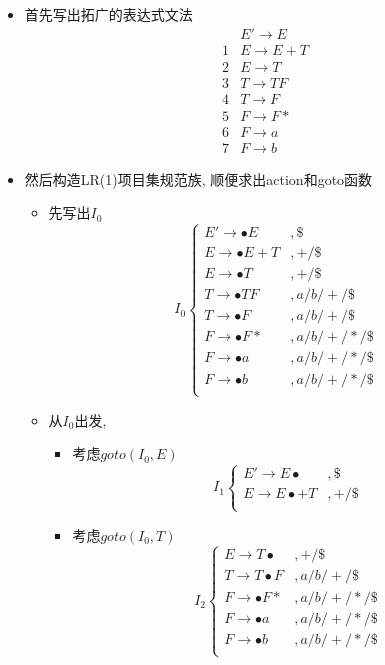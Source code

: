 \documentclass[UTF8]{article}
\newcommand{\blt}{\bullet}
\begin{document}
\begin{itemize}
\item 首先写出拓广的表达式文法
$$\begin{array}{ll}
 & E'\rightarrow E\\
1 & E\rightarrow E+T\\
2 & E\rightarrow T\\
3 & T\rightarrow TF\\
4 & T\rightarrow F\\
5 & F\rightarrow F*\\
6 & F\rightarrow a\\
7 & F\rightarrow b
\end{array}$$
\item 然后构造LR(1)项目集规范族, 顺便求出action和goto函数
	\begin{itemize}
	\item 先写出$I_0$
	$$I_0\left\{\begin{array}{ll}
	E'\rightarrow \blt E & ,\$\\
	E\rightarrow \blt E+T & ,+/\$\\
	E\rightarrow\blt T & ,+/\$\\
	T\rightarrow\blt TF & ,a/b/+/\$\\
	T\rightarrow\blt F & , a/b/+/\$\\
	F\rightarrow\blt F* & , a/b/+/*/\$\\
	F\rightarrow\blt a & ,a/b/+/*/\$\\
	F\rightarrow\blt b & ,a/b/+/*/\$\\
	\end{array}\right.$$
	\item 从$I_0$出发,
		\begin{itemize}
		\item 考虑$goto(I_0,E)$
			$$I_1\left\{\begin{array}{ll}
			E'\rightarrow E\blt & ,\$\\
			E\rightarrow  E\blt+T & ,+/\$\\
			\end{array}\right.$$
		\item 考虑$goto(I_0,T)$
			$$I_2\left\{\begin{array}{ll}
			E\rightarrow T\blt & ,+/\$\\
			T\rightarrow T\blt F & ,a/b/+/\$\\
			F\rightarrow\blt F* & , a/b/+/*/\$\\
			F\rightarrow\blt a & ,a/b/+/*/\$\\
			F\rightarrow\blt b & ,a/b/+/*/\$\\

\end{array}$$
\end{itemize}
\end{itemize}
\end{itemize}
\end{document}
